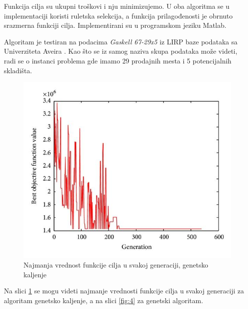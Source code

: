 \documentclass[a4paper]{article}
\begin{document}
Funkcija cilja su ukupni troškovi i nju minimizujemo. U oba algoritma se u implementaciji koristi ruletska selekcija, a funkcija prilagođenosti je obrnuto srazmerna funkciji cilja. Implementirani su u programskom jeziku Matlab. \\ \par
Algoritam je testiran na podacima \textit{Gaskell 67-29x5} iz LIRP baze podataka sa Univerziteta Aveira \cite{lrp_database}. Kao što se iz samog naziva skupa podataka može videti, radi se o instanci problema gde imamo 29 prodajnih mesta i 5 potencijalnih skladišta. 

\begin{figure}[h!]
\centering
\includegraphics[scale= 0.4]{LIRP_Grafik_Genetsko_Kaljenje.jpg}
\caption{Najmanja vrednost funkcije cilja u svakoj generaciji, genetsko kaljenje}
\label{fig:3}
\end{figure}

Na slici \ref{fig:3} se mogu videti najmanje vrednosti funkcije cilja u svakoj generaciji za algoritam genetsko kaljenje, a na slici \ref{fig:4} za genetski algoritam.
\end{document}
